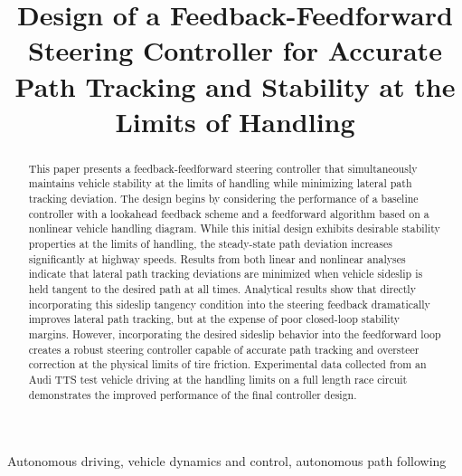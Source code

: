\documentclass{nVSD2e}
\theoremstyle{plain}
\theoremstyle{definition}
\theoremstyle{remark}
\begin{document}


\title{Design of a Feedback-Feedforward Steering Controller for Accurate Path Tracking and Stability at the Limits of Handling}

\author{
}

\maketitle

\begin{abstract}

This paper presents a feedback-feedforward steering controller that simultaneously maintains vehicle stability at the limits
of handling while minimizing lateral path tracking deviation. The design begins by considering the performance of a baseline
controller with a lookahead feedback scheme and a feedforward algorithm based on a nonlinear vehicle handling diagram.
While this initial design exhibits desirable stability properties 
at the limits of handling, the steady-state path deviation increases significantly at highway speeds. 
Results from both linear and nonlinear analyses indicate that lateral path tracking deviations are minimized when vehicle sideslip 
is held tangent to the desired path at all times. Analytical results show that 
directly incorporating this sideslip tangency condition into the steering feedback dramatically improves lateral path tracking, 
but at the expense of poor closed-loop stability margins.  However, incorporating the desired sideslip behavior
into the feedforward loop creates a robust steering controller capable of accurate path 
tracking and oversteer correction at the physical limits of tire friction. Experimental data collected from an 
Audi TTS test vehicle driving at the handling limits on a full length race circuit demonstrates the improved performance of the final
controller design. 
\end{abstract}

\begin{keywords}Autonomous driving, vehicle dynamics and control, autonomous path following
\end{keywords}
\end{document}
